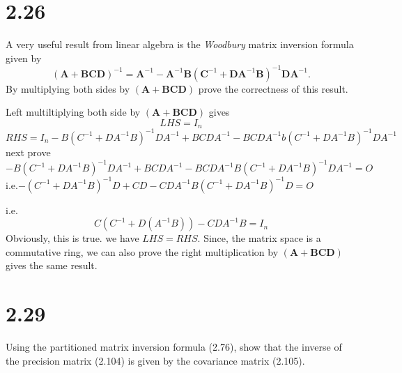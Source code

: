 \documentclass[a4paper, 11pt]{article}
\begin{document}
\section*{2.26}
A very useful result from linear algebra is the \emph{Woodbury} matrix
inversion formula given by
\begin{equation}
    (\bm{A}+\bm{B}\bm{C}\bm{D})^{-1}
    = \bm{A}^{-1} - \bm{A}^{-1}\bm{B}
    (\bm{C}^{-1}+\bm{D}\bm{A}^{-1}\bm{B})^{-1}
    \bm{D}\bm{A}^{-1}.
    \tag{2.289}
\end{equation}
By multiplying both sides by $(\bm{A}+\bm{B}\bm{C}\bm{D})$ prove the
correctness of this result.

Left multiltiplying both side by $(\bm{A}+\bm{B}\bm{C}\bm{D})$ gives
\[
LHS=I_n
\]
\[
RHS=I_n-B(C^{-1}+DA^{-1}B)^{-1}DA^{-1}+BCDA^{-1}-BCDA^{-1}b(C^{-1}+DA^{-1}B)^{-1}DA^{-1}
\]
next prove  $-B(C^{-1}+DA^{-1}B)^{-1}DA^{-1}+BCDA^{-1}-BCDA^{-1}B(C^{-1}+DA^{-1}B)^{-1}DA^{-1}=O$
i.e.$-(C^{-1}+DA^{-1}B)^{-1}D+CD-CDA^{-1}B(C^{-1}+DA^{-1}B)^{-1}D=O$

i.e.
\[
C(C^{-1}+D(A^{-1}B))-CDA^{-1}B=I_n
\]
Obviously, this is true. we have $LHS=RHS$.
Since, the matrix space is a commutative ring, we can also prove the right multiplication by $(\bm{A}+\bm{B}\bm{C}\bm{D})$ gives the same result.
\section*{2.29}
Using the partitioned matrix inversion formula (2.76), show that the
inverse of the precision matrix (2.104) is given by the covariance
matrix (2.105).
\end{document}
